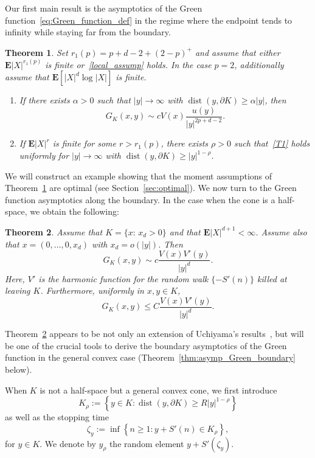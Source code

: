 \documentclass[10pt]{amsart}
\newtheorem{theo}{Theorem}[section]
\theoremstyle{definition}\newtheorem{defi}[theo]{Definition}\newtheorem{rema}[theo]{Remark}\newtheorem{exam}[theo]{Example}\newtheorem{exem}[theo]{Example}\newtheorem{nota}[theo]{Notation}
\DeclareMathOperator{\dist}{dist}
\newcommand{\e}{\mathbf{E}}
\renewcommand{\le}{\leqslant}
\renewcommand{\ge}{\geqslant}
\renewcommand{\geq}{\geqslant}
\newcommand*{\alphenumi}{\renewcommand*{\theenumi}{\alph{enumi}}}
\begin{document}
Our first main result is the asymptotics of the Green function~\eqref{eq:Green_function_def} in the regime where the endpoint tends to infinity while staying far from the boundary.
\begin{theo}\label{thm:deep}
Set $r_1(p)=p+d-2+(2-p)^+$ and assume that either $\e| X|^{r_1(p)}$ is finite or~\eqref{local_assump} holds. In the case $p=2$, additionally assume that $\e[| X|^d\log| X|]$ is finite.
%
\begin{enumerate}\alphenumi
\item\label{itA}
If there exists $\alpha>0$ such that $| y|\to\infty$ with $\dist(y,\partial K)\ge \alpha| y|$, then
\begin{equation}\label{T1}
G_K(x,y)
\sim cV(x)\frac{u(y)}{| y|^{2p+d-2}}.
\end{equation}
\item\label{itB}
If $\e| X|^{r}$ is finite for some $r>r_1(p)$, there exists $\rho>0$ such that~\eqref{T1} holds uniformly for $| y|\to\infty$ with $\dist(y,\partial K)\ge | y| ^{1-\rho}$.
\end{enumerate}
\end{theo}

We will construct an example showing that the moment assumptions of Theorem~\ref{thm:deep} are optimal (see Section~\ref{sec:optimal}). We now turn to the Green function asymptotics along the boundary. In the case when the cone is a half-space, we obtain the following:

\begin{theo}\label{thm:half-space}
Assume that $K=\{x:\, x_d>0\}$ and that $\e| X|^{d+1}<\infty$. Assume also that $x=(0,\ldots,0,x_d)$ with $x_d=o(| y|)$. Then
\[
G_K(x,y)\sim c\frac{V(x)V'(y)}{| y|^d}.
\]
Here, $V'$ is the harmonic function for the random walk $\{-S'(n)\}$ killed at leaving $K$. Furthermore, uniformly in $x,y\in K$,
\[
G_K(x,y)\le C\frac{V(x)V'(y)}{|y|^{d}}.
\]
\end{theo}

Theorem~\ref{thm:half-space} appears to be not only an extension of Uchiyama's results~\cite{Uc-14}, but will be one of the crucial tools to derive the boundary asymptotics of the Green function in the general convex case (Theorem~\ref{thm:asymp_Green_boundary} below).

When $K$ is not a half-space but a general convex cone, we first introduce
\begin{equation}\label{eq:K_rho}
{K}_{\rho}:=\left\{ y\in{K}:\dist(y,\partial {K})\geq R| y|^{1-\rho}\right\}
\end{equation}
as well as the stopping time
\begin{equation}\label{eq:stopping_time_theta}
\zeta_{y}:=\inf\left\{n\geq 1: y+S'(n)\in {K}_{\rho}\right\},
\end{equation}
for $y\in{K}$. We denote by $y_{\rho}$ the random element $y+S'(\zeta_{y})$.
\end{document}

